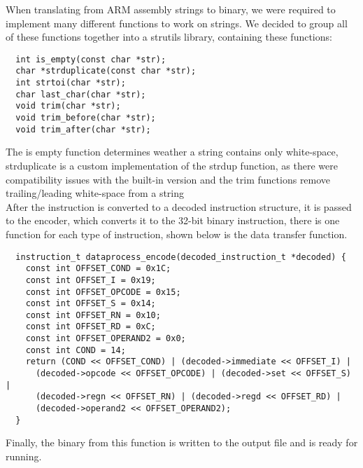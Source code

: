 When translating from ARM assembly strings to binary, we were required to implement many different functions to work on strings. We decided to group all of these functions together into a str\textunderscore{}utils library, containing these functions:

\begin{verbatim}
  int is_empty(const char *str);
  char *strduplicate(const char *str);
  int strtoi(char *str);
  char last_char(char *str);
  void trim(char *str);
  void trim_before(char *str);
  void trim_after(char *str);
\end{verbatim} 

The is empty function determines weather a string contains only white-space, strduplicate is a custom implementation of the strdup function, as there were compatibility issues with the built-in version and the trim functions remove trailing/leading white-space from a string
~\\

After the instruction is converted to a decoded instruction structure, it is passed to the encoder, which converts it to the 32-bit binary instruction, there is one function for each type of instruction, shown below is the data transfer function.

\begin{verbatim}
  instruction_t dataprocess_encode(decoded_instruction_t *decoded) {
    const int OFFSET_COND = 0x1C;
    const int OFFSET_I = 0x19;
    const int OFFSET_OPCODE = 0x15;
    const int OFFSET_S = 0x14;
    const int OFFSET_RN = 0x10;
    const int OFFSET_RD = 0xC;
    const int OFFSET_OPERAND2 = 0x0;
    const int COND = 14;
    return (COND << OFFSET_COND) | (decoded->immediate << OFFSET_I) |
      (decoded->opcode << OFFSET_OPCODE) | (decoded->set << OFFSET_S) |
      (decoded->regn << OFFSET_RN) | (decoded->regd << OFFSET_RD) |
      (decoded->operand2 << OFFSET_OPERAND2);
  }
\end{verbatim}

Finally, the binary from this function is written to the output file and is ready for running.